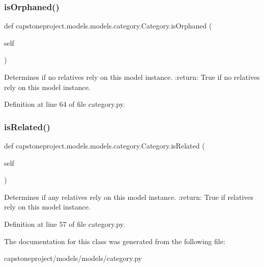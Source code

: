 \subsubsection{\texorpdfstring{is\+Orphaned()}{isOrphaned()}}
{\footnotesize\ttfamily def capstoneproject.\+models.\+models.\+category.\+Category.\+is\+Orphaned (\begin{DoxyParamCaption}\item[{}]{self }\end{DoxyParamCaption})}

\begin{DoxyVerb}Determines if no relatives rely on this model instance.
:return: True if no relatives rely on this model instance.
\end{DoxyVerb}
 

Definition at line 64 of file category.\+py.

\mbox{\label{classcapstoneproject_1_1models_1_1models_1_1category_1_1_category_a06d132bc2c34f2fa0591f9580aa21d32}} 
\subsubsection{\texorpdfstring{is\+Related()}{isRelated()}}
{\footnotesize\ttfamily def capstoneproject.\+models.\+models.\+category.\+Category.\+is\+Related (\begin{DoxyParamCaption}\item[{}]{self }\end{DoxyParamCaption})}

\begin{DoxyVerb}Determines if any relatives rely on this model instance.
:return: True if relatives rely on this model instance.
\end{DoxyVerb}
 

Definition at line 57 of file category.\+py.



The documentation for this class was generated from the following file\+:\begin{DoxyCompactItemize}
\item 
capstoneproject/models/models/category.\+py\end{DoxyCompactItemize}
